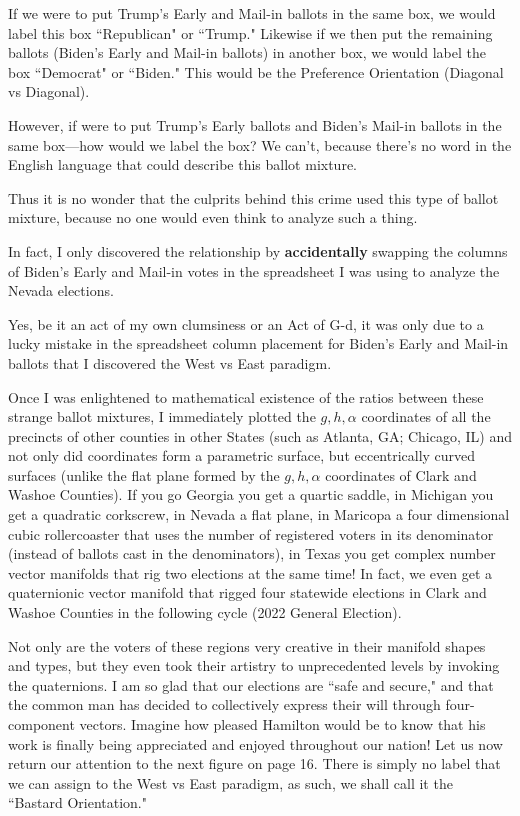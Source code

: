 \documentclass[preprint,13pt]{elsarticle}
\begin{document}
If we were to put Trump's Early and Mail-in ballots in the same box, we would label this box ``Republican" or ``Trump." Likewise if we then put the remaining ballots (Biden's Early and Mail-in ballots) in another box, we would label the box ``Democrat" or ``Biden." This would be the Preference Orientation (Diagonal vs Diagonal).

However, if were to put Trump's Early ballots and Biden's Mail-in ballots in the same box---how would we label the box? We can't, because there's no word in the English language that could describe this ballot mixture. 

Thus it is no wonder that the culprits behind this crime used this type of ballot mixture, because no one would even think to analyze such a thing. 

In fact, I only discovered the relationship by \textbf{accidentally} swapping the columns of Biden's Early and Mail-in votes in the spreadsheet I was using to analyze the Nevada elections. 

Yes, be it an act of my own clumsiness or an Act of G-d, it was only due to a lucky mistake in the spreadsheet column placement for Biden's Early and Mail-in ballots that I discovered the West vs East paradigm.

Once I was enlightened to mathematical existence of the ratios between these strange ballot mixtures, I immediately plotted the $g,h,\alpha$ coordinates of all the precincts of other counties in other States (such as Atlanta, GA; Chicago, IL) and not only did coordinates form a parametric surface, but eccentrically curved surfaces (unlike the flat plane formed by the $g,h,\alpha$ coordinates of Clark and Washoe Counties). If you go Georgia you get a quartic saddle, in Michigan you get a quadratic corkscrew, in Nevada a flat plane, in Maricopa a four dimensional cubic rollercoaster that uses the number of registered voters in its denominator (instead of ballots cast in the denominators), in Texas you get complex number vector manifolds that rig two elections at the same time! In fact, we even get a quaternionic vector manifold that rigged four statewide elections in Clark and Washoe Counties in the following cycle (2022 General Election).

Not only are the voters of these regions very creative in their manifold shapes and types, but they even took their artistry to unprecedented levels by invoking the quaternions. I am so glad that our elections are ``safe and secure," and that the common man has decided to collectively express their will through four-component vectors. Imagine how pleased Hamilton would be to know that his work is finally being appreciated and enjoyed throughout our nation!
\newpage
Let us now return our attention to the next figure on page 16. There is simply no label that we can assign to the West vs East paradigm, as such, we shall call it the ``Bastard Orientation."
\end{document}
